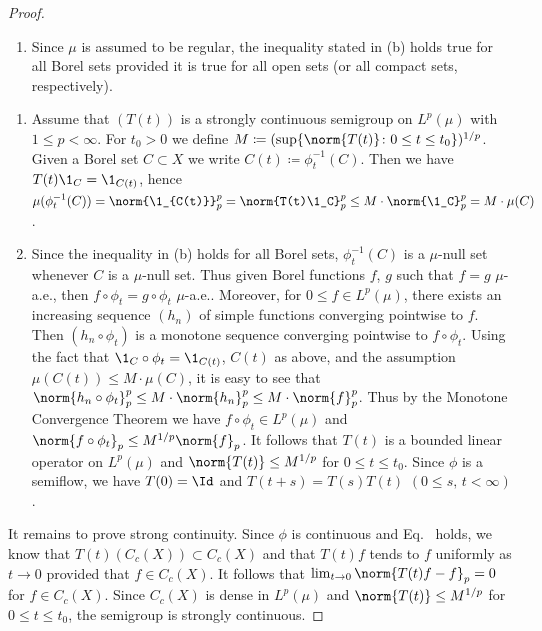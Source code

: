 \begin{proof}
\begin{enumerate}[\upshape (i), wide, labelindent=.25em]
\item
Since $\mu$ is assumed to be regular, the inequality stated in (b) holds true for all Borel sets provided it is true for all open sets (or all compact sets, respectively).
\end{enumerate}

\begin{enumerate}[wide, labelindent=.25em]

\item[$(a)\Rightarrow(b)$:] 
Assume that $(T(t))$ is a strongly continuous semigroup on
$L^p(\mu)$ with $1 \leq p < \infty$. For $t_0 > 0$ we define $M \coloneqq  (\sup\{\norm{T(t)} \colon 0 \leq t \leq t_0\})^{1/p}$.
Given a Borel set $C \subset X$ we write $C(t) \coloneqq  \phi_t^{-1}(C)$.
Then we have $T(t)\1_C = \1_{C(t)}$, hence
$\mu(\phi_t^{-1}(C)) = \norm{\1_{C(t)}}_p^p = \norm{T(t)\1_C}_p^p \leq M \cdot \norm{\1_C}_p^p = M \cdot \mu(C)$.

\item[$(b)\Rightarrow(a)$:] 
Since the inequality in (b) holds for all Borel sets,
$\phi_t^{-1}(C)$ is a $\mu$-null set whenever $C$ is a $\mu$-null set. 
Thus given
Borel functions $f$, $g$ such that $f = g$ $\mu$-a.e., then $f \circ \phi_t = g \circ \phi_t$
$\mu$-a.e.. 
Moreover, for $0 \leq f \in L^p(\mu)$, there exists an increasing
sequence $(h_n)$ of simple functions converging pointwise to $f$. Then
$(h_n \circ \phi_t)$ is a monotone sequence converging pointwise to $f \circ \phi_t$. Using
the fact that $\1_C \circ \phi_t = \1_{C(t)}$, $C(t)$ as above, and the assumption
$\mu(C(t)) \leq M \cdot \mu(C)$, it is easy to see that $\norm{h_n \circ \phi_t}_p^p \leq M \cdot \norm{h_n}_p^p \leq M \cdot \norm{f}_p^p$.
Thus by the Monotone Convergence Theorem we have $f \circ \phi_t \in L^p(\mu)$ and
$\norm{f \circ \phi_t}_p \leq M^{1/p}\norm{f}_p$. It follows that $T(t)$ is a bounded linear
operator on $L^p(\mu)$ and $\norm{T(t)} \leq M^{1/p}$ for $0 \leq t \leq t_0$. Since $\phi$ is a
semiflow, we have $T(0) = \Id $ and $T(t+s) = T(s)T(t)$ $(0 \leq s,\,t < \infty)$. 
\end{enumerate}
It remains to prove strong continuity. Since $\phi$ is continuous and Eq.~
holds, we know that $T(t)(C_c(X)) \subset C_c(X)$ and that $T(t)f$ tends to $f$
uniformly as $t \to 0$ provided that $f \in C_c(X)$. It follows that
$\lim_{t \to 0}\norm{T(t)f - f}_p = 0$ for $f \in C_c(X)$. Since $C_c(X)$ is dense in
$L^p(\mu)$ and $\norm{T(t)} \leq M^{1/p}$ for $0 \leq t \leq t_0$, the semigroup is strongly
continuous.


\end{proof}
